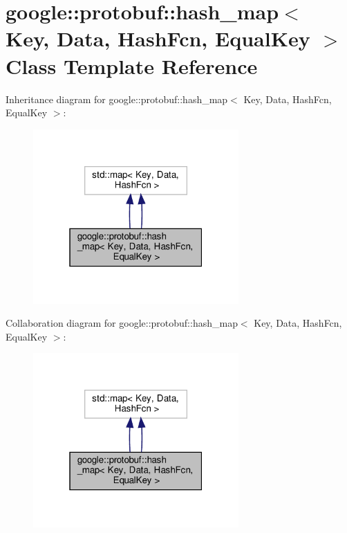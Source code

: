 \hypertarget{classgoogle_1_1protobuf_1_1hash__map}{}\section{google\+:\+:protobuf\+:\+:hash\+\_\+map$<$ Key, Data, Hash\+Fcn, Equal\+Key $>$ Class Template Reference}
\label{classgoogle_1_1protobuf_1_1hash__map}


Inheritance diagram for google\+:\+:protobuf\+:\+:hash\+\_\+map$<$ Key, Data, Hash\+Fcn, Equal\+Key $>$\+:
\nopagebreak
\begin{figure}[H]
\begin{center}
\leavevmode
\includegraphics[width=223pt]{classgoogle_1_1protobuf_1_1hash__map__inherit__graph}
\end{center}
\end{figure}


Collaboration diagram for google\+:\+:protobuf\+:\+:hash\+\_\+map$<$ Key, Data, Hash\+Fcn, Equal\+Key $>$\+:
\nopagebreak
\begin{figure}[H]
\begin{center}
\leavevmode
\includegraphics[width=223pt]{classgoogle_1_1protobuf_1_1hash__map__coll__graph}
\end{center}
\end{figure}
